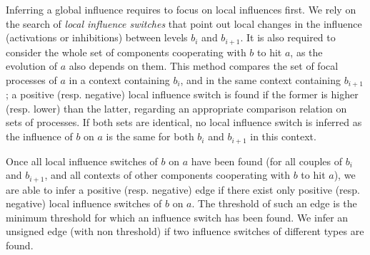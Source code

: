 Inferring a global influence requires to focus on local influences first.
We rely on the search of \emph{local influence switches} that point out local changes in the influence (activations or inhibitions) between levels $b_i$ and $b_{i+1}$.
It is also required to consider the whole set of components cooperating with $b$ to hit $a$, as the evolution of $a$ also depends on them.
This method compares the set of focal processes of $a$ in a context containing $b_i$, and in the same context containing $b_{i+1}$;
a positive (resp. negative) local influence switch is found if the former is higher (resp. lower) than the latter, regarding an appropriate comparison relation on sets of processes.
If both sets are identical, no local influence switch is inferred as the influence of $b$ on $a$ is the same for both $b_i$ and $b_{i+1}$ in this context.

Once all local influence switches of $b$ on $a$ have been found (for all couples of $b_i$ and $b_{i+1}$, and all contexts of other components cooperating with $b$ to hit $a$),
we are able to infer a positive (resp. negative) edge if there exist only positive (resp. negative) local influence switches of $b$ on $a$.
The threshold of such an edge is the minimum threshold for which an influence switch has been found.
We infer an unsigned edge (with non threshold) if two influence switches of different types are found.

\begin{comment}
The inference of the \emph{influence switches}, which point out local changes in the influence (activations or inhibitions) between levels $b_i$ and $b_{i+1}$, requires to consider the whole set of components cooperating with $b$ to hit $a$.
The method relies on the comparison of the focal processes of $a$ in a context containing $b_i$, and in the same context containing $b_{i+1}$.
We are able to infer a positive (resp. negative) edge if there exist corresponding influence switches with the same sign only; the threshold of such an edge is the minimum threshold for which an influence switch has been found.
We infer an unsigned edge (with non threshold) when two influence switches with different signs are found.
\end{comment}

